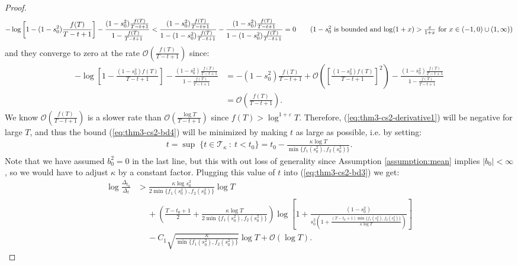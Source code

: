 \begin{proof}
\small
\begin{align*}
    - \log\left[1 - (1 - s_0^2)\frac{f(T)}{T-t+1}\right] - \frac{(1 - s_0^2)\frac{f(T)}{T-t+1}}{1 - \frac{f(T)}{T - t + 1}} < \frac{ (1 - s_0^2)\frac{f(T)}{T-t+1}}{1 - (1 - s_0^2)\frac{f(T)}{T-t+1}}- \frac{(1 - s_0^2)\frac{f(T)}{T-t+1}}{1 - (1-s_0^2)\frac{f(T)}{T - t + 1}} = 0 \tag{$1 - s_0^2$ is bounded and $\log(1 + x) > \frac{x}{1+x}$ for $x \in (-1,0)\cup(1,\infty)$}
\end{align*}
\normalsize
and they converge to zero at the rate $\mathcal{O}\left(\frac{f(T)}{T-t+1}\right)$ since:
\small
\begin{align*}
    - \log\left[1 -\frac{ (1 - s_0^2)f(T)}{T-t+1}\right] - \frac{(1 - s_0^2)\frac{f(T)}{T-t+1}}{1 - \frac{f(T)}{T - t + 1}} &= -(1 - s_0^2)\frac{f(T)}{T-t+1} + \mathcal{O}\left(\left[\frac{(1 - s_0^2)f(T)}{T-t+1}\right]^2\right) - \frac{(1 - s_0^2)\frac{f(T)}{T-t+1}}{1 - \frac{f(T)}{T - t + 1}} \\
    &= \mathcal{O}\left(\frac{f(T)}{T-t+1}\right).
\end{align*}
\normalsize
We know $\mathcal{O}\left(\frac{f(T)}{T-t+1}\right)$ is a slower rate than $\mathcal{O}\left(\frac{\log T}{T-t+1}\right)$ since $f(T) > \log^{1+\varepsilon} T$. Therefore, (\ref{eq:thm3-cs2-derivative1}) will be negative for large $T$, and thus the bound (\ref{eq:thm3-cs2-bd4}) will be minimized by making $t$ as large as possible, i.e. by setting: 
\begin{align*}
    t = \sup\;\{t \in \mathcal{T}_{\kappa} \::\: t< t_0\} = t_0 - \frac{\kappa \log T}{\min\{f_1(s_0^2), f_2(s_0^2)\}}. 
\end{align*}
Note that we have assumed $b_0^2 = 0$ in the last line, but this with out loss of generality since Assumption \ref{assumption:mean} implies $|b_0| < \infty$, so we would have to adjust $\kappa$ by a constant factor. Plugging this value of $t$ into (\ref{eq:thm3-cs2-bd3}) we get:
\begin{align*}
    \log \frac{\Delta_{t_0}}{\Delta_t} &> \frac{\kappa \log s_0^2 }{2\min\{f_1(s_0^2), f_2(s_0^2)\}}\log T \\
    &\quad\: + \left(\frac{T - t_0 +1}{2} + \frac{\kappa \log T}{2\min\{f_1(s_0^2), f_2(s_0^2)\}}\right)\log\left[1 + \frac{(1 - s_0^2)}{s_0^{2}\left(1+ \frac{(T-t_0+1)\min\{f_1(s_0^2), f_2(s_0^2)\}}{\kappa \log T}\right)}\right]  \\
    &\quad\: -C_1\sqrt{\frac{\kappa}{\min\{f_1(s_0^2), f_2(s_0^2)\}}} \log T  + \mathcal{O}(\log T).
\end{align*}

\end{proof}

